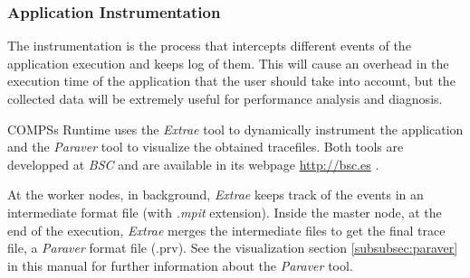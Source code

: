 \subsubsection{Application Instrumentation}
The instrumentation is the process that intercepts different events of the application execution 
and keeps log of them. This will cause an overhead in the execution time of the application that 
the user should take into account, but the collected data will be extremely useful for performance 
analysis and diagnosis.

COMPSs Runtime uses the \textit{Extrae} tool to dynamically instrument the application and the \textit{Paraver} tool to visualize
the obtained tracefiles. Both tools are developped at \textit{BSC} and are available in its webpage \url{http://bsc.es} . 

At the worker nodes, in background, \textit{Extrae} keeps track of the events in an intermediate format 
file (with \textit{.mpit} extension). Inside the master node, at the end of the execution, \textit{Extrae} merges the 
intermediate files to get the final trace file, a \textit{Paraver} format file (.prv). See the visualization 
section \ref{subsubsec:paraver} in this manual for further information about the \textit{Paraver} tool.

